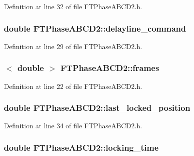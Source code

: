Definition at line 32 of file FTPhaseABCD2.h.

\hypertarget{classFTPhaseABCD2_a7f4b7f87005097bc4fc7674187c5c8d9}{
\subsubsection[{delayline\_\-command}]{\setlength{\rightskip}{0pt plus 5cm}double {\bf FTPhaseABCD2::delayline\_\-command}}}
\label{classFTPhaseABCD2_a7f4b7f87005097bc4fc7674187c5c8d9}


Definition at line 29 of file FTPhaseABCD2.h.

\hypertarget{classFTPhaseABCD2_ac1284b3c87b8a3fcb28fb7aa25021e31}{
\subsubsection[{frames}]{$<$ double $>$ {\bf FTPhaseABCD2::frames}}}
\label{classFTPhaseABCD2_ac1284b3c87b8a3fcb28fb7aa25021e31}


Definition at line 22 of file FTPhaseABCD2.h.

\hypertarget{classFTPhaseABCD2_ac981d1d5990f77f19c3094a871a55697}{
\subsubsection[{last\_\-locked\_\-position}]{\setlength{\rightskip}{0pt plus 5cm}double {\bf FTPhaseABCD2::last\_\-locked\_\-position}}}
\label{classFTPhaseABCD2_ac981d1d5990f77f19c3094a871a55697}


Definition at line 34 of file FTPhaseABCD2.h.

\hypertarget{classFTPhaseABCD2_af4c9fb7aeb95a2bf45cbfcf7aa0c1eca}{
\subsubsection[{locking\_\-time}]{\setlength{\rightskip}{0pt plus 5cm}double {\bf FTPhaseABCD2::locking\_\-time}}}
\label{classFTPhaseABCD2_af4c9fb7aeb95a2bf45cbfcf7aa0c1eca}


